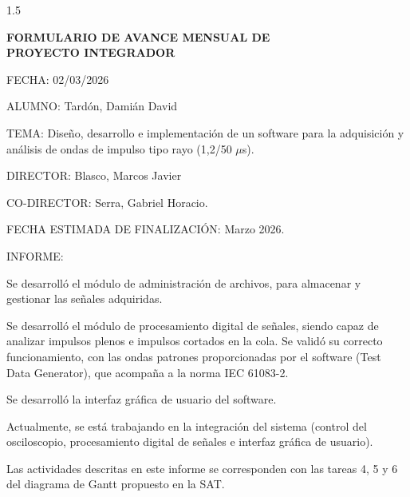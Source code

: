 \documentclass[11pt]{report} %
\begin{document}
    \begin{spacing}{1.5}
        \begin{flushleft}
            
                \begin{center}
                    \Large
                    \textbf{FORMULARIO DE AVANCE MENSUAL DE\\
                    PROYECTO INTEGRADOR}
                \end{center}
                \vspace{2em}
                
                FECHA: 02/03/2026

                ALUMNO: Tardón, Damián David

                TEMA: Diseño, desarrollo e implementación de un software para la adquisición y análisis de ondas de impulso tipo rayo (1,2/50 \(\mu\)s).
                
                DIRECTOR: Blasco, Marcos Javier

                CO-DIRECTOR: Serra, Gabriel Horacio.

                FECHA ESTIMADA DE FINALIZACIÓN: Marzo 2026.
                
                \hrulefill
                
                INFORME:
            
        \end{flushleft}
    \end{spacing}

    Se desarrolló el módulo de administración de archivos, para almacenar y gestionar las señales adquiridas.\par
    Se desarrolló el módulo de procesamiento digital de señales, siendo capaz de analizar impulsos plenos e impulsos cortados en la cola. Se validó su correcto funcionamiento, con las ondas patrones proporcionadas por el software (Test Data Generator), que acompaña a la norma IEC 61083-2.\par
    Se desarrolló la interfaz gráfica de usuario del software.\par
    Actualmente, se está trabajando en la integración del sistema (control del osciloscopio, procesamiento digital de señales e interfaz gráfica de usuario).\par
    Las actividades descritas en este informe se corresponden con las tareas 4, 5 y 6 del diagrama de Gantt propuesto en la SAT.\par
    
\end{document}
